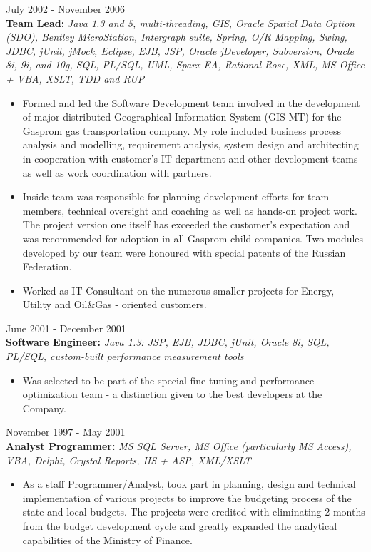 \documentclass{res}
\begin{document}
\begin{resume}
 \hfill        July 2002 - November 2006\\
{\bf Team Lead:} {\em Java 1.3 and 5, multi-threading, GIS, Oracle Spatial Data Option (SDO), Bentley MicroStation, Intergraph suite, Spring, O/R Mapping, Swing, JDBC, jUnit, jMock, Eclipse, EJB, JSP, Oracle jDeveloper, Subversion, Oracle 8i, 9i, and 10g, SQL, PL/SQL, UML, Sparx EA, Rational Rose, XML, MS Office + VBA, XSLT, TDD and RUP}
\begin{itemize} \itemsep -2pt %
 \item Formed and led the Software Development team involved in the development of major distributed Geographical Information System (GIS MT) for the Gasprom gas transportation company. My role included business process analysis and modelling, requirement analysis, system design and architecting in cooperation with customer’s IT department and other development teams as well as work coordination with partners.
 \item Inside team was responsible for planning development efforts for team members, technical oversight and coaching as well as hands-on project work. The project version one itself has exceeded the customer’s expectation and was recommended for adoption in all Gasprom child companies. Two modules developed by our team were honoured with special patents of the Russian Federation.
 \item Worked as IT Consultant on the numerous smaller projects for Energy, Utility and Oil\&Gas - oriented customers.
\end{itemize}

 \hfill        June 2001 - December 2001\\
{\bf Software Engineer:} {\em Java 1.3: JSP, EJB, JDBC, jUnit, Oracle 8i, SQL, PL/SQL, custom-built performance measurement tools}
\begin{itemize} \itemsep -2pt %
 \item Was selected to be part of the special fine-tuning and performance optimization team - a distinction given to the best developers at the Company.
\end{itemize}

 \hfill        November 1997 - May 2001\\
{\bf Analyst Programmer:} {\em MS SQL Server, MS Office (particularly MS Access), VBA, Delphi, Crystal Reports, IIS + ASP, XML/XSLT}
\begin{itemize}
 \item As a staff Programmer/Analyst, took part in planning, design and technical implementation of various projects to improve the budgeting process of the state and local budgets.  The projects were credited with eliminating 2 months from the budget development cycle and greatly expanded the analytical capabilities of the Ministry of Finance.
\end{itemize}


\end{resume}
\end{document}
